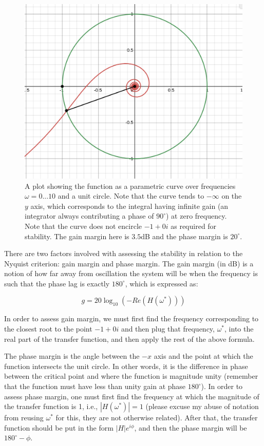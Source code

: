 \documentclass[11pt, letterpaper]{article}
\begin{document}
\begin{figure}[H]
    \centering
    \includegraphics[width=12cm]{nyquistPlot.png}
    \caption{ A plot showing the function as a parametric curve over frequencies $\omega=0...10$ and a unit circle. Note that the curve tends to $-\infty$ on the $y$ axis, which corresponds to the integral having infinite gain (an integrator always contributing a phase of $90^{\circ}$) at zero frequency. Note that the curve does not encircle $-1+0i$ as required for stability. The gain margin here is $3.5$dB and the phase margin is $20^{\circ}$. }
    \label{fig:nyquistPlot}
\end{figure}

There are two factors involved with assessing the stability in relation to the Nyquist criterion: gain margin and phase margin. The gain margin (in dB) is a notion of how far away from oscillation the system will be when the frequency is such that the phase lag is exactly $180^{\circ}$, which is expressed as:

$$ g = 20 \log_{10} \left( -Re(H(\omega^*))\right) $$

In order to assess gain margin, we must first find the frequency corresponding to the closest root to the point $-1+0i$ and then plug that frequency, $\omega^*$, into the real part of the transfer function, and then apply the rest of the above formula.

The phase margin is the angle between the $-x$ axis and the point at which the function intersects the unit circle. In other words, it is the difference in phase between the critical point and where the function is magnitude unity (remember that the function must have less than unity gain at phase $180^{\circ}$). In order to assess phase margin, one must first find the frequency at which the magnitude of the transfer function is 1, i.e., $|H(\omega^*)|=1$ (please excuse my abuse of notation from reusing $\omega^*$ for this, they are not otherwise related).  After that, the transfer function should be put in the form $|H|e^{i\phi}$, and then the phase margin will be $180^{\circ} - \phi$. 
\end{document}
